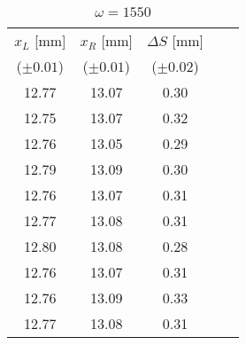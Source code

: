 \begin{table}[H]
    \centering
    \begin{tabular}{|c|c|c|c c|}
    \hline
    $x_L$ [mm]	&	$x_R$ [mm]	&	$\Delta S$ [mm]	\\
    ($\pm 0.01$)	&	 ($\pm 0.01$)	& ($\pm 0.02$)	\\
    \hline
        12.77	&	13.07	&	0.30	\\
        12.75	&	13.07	&	0.32	\\
        12.76	&	13.05	&	0.29	\\
        12.79	&	13.09	&	0.30	\\
        12.76	&	13.07	&	0.31	\\
        12.77	&	13.08	&	0.31	\\
        12.80	&	13.08	&	0.28	\\
        12.76	&	13.07	&	0.31	\\
        12.76	&	13.09	&	0.33	\\
        12.77	&	13.08	&	0.31	\\
    \hline
    \end{tabular}
    \caption{$\omega = 1550$}
\end{table}